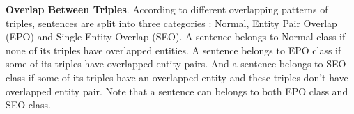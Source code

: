 \documentclass[letterpaper]{article} \usepackage{aaai21}  \usepackage{times}  \usepackage{helvet} \usepackage{courier}  \usepackage[hyphens]{url}  \usepackage{graphicx} \usepackage{amsfonts,amssymb}
\begin{document}
\textbf{Overlap Between Triples}. According to different overlapping patterns of triples, sentences are split into three categories \cite{zeng2018extracting}: Normal, Entity Pair Overlap (EPO) and Single Entity Overlap (SEO). A sentence belongs to Normal class if none of its triples have overlapped entities. A sentence belongs to EPO class if some of its triples have overlapped entity pairs. And a sentence belongs to SEO class if some of its triples have an overlapped entity and these triples don’t have overlapped entity pair. Note that a sentence
can belongs to both EPO class and SEO class.
\begin{table}[h]
\begin{center}
\caption{The statistics of NYT and WebNLG.}
\label{dataset}
\end{center}
\end{table}
\end{document}
